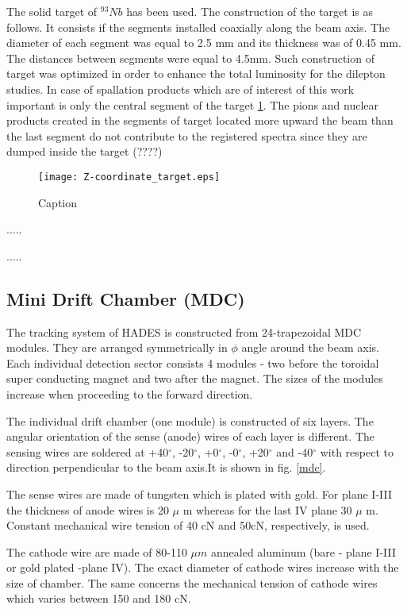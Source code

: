 The solid target of $^{93}Nb$ has been used. 
The construction of the target is as follows. 
It consists if the segments installed coaxially along the beam axis.
The diameter of each segment was equal to 2.5 mm and its thickness was of 0.45 mm.
The distances between segments were equal to 4.5mm. Such construction of target was optimized in order to enhance the total luminosity 
for the dilepton studies. 
In case of spallation products which are of interest of this work important is only the 
central segment of the target \ref{Z-coordinate}. The pions and nuclear products created in the segments of target 
located more upward the beam than the last segment do not contribute to the registered spectra 
since they are dumped inside the target (????)
\begin{figure}[H]
    \centering
    \texttt{[image: Z-coordinate\_target.eps]}
    \caption{Caption}
    \label{Z-coordinate}
\end{figure}
.....

.....


\subsection{Mini Drift Chamber (MDC)}
The tracking system of HADES is constructed from 24-trapezoidal MDC modules. 
They are arranged symmetrically in $\phi$ angle around the beam axis. 
Each individual detection sector consists 4 modules -  two before 
the toroidal super conducting magnet and two after the magnet.
The sizes of the modules increase when proceeding to the forward direction. 

The individual drift chamber (one module) is constructed of six layers. 
The angular orientation of the sense (anode) wires of each layer is different. 
The sensing wires are soldered at +40$^\circ$,  -20$^\circ$, +0$^\circ$, -0$^\circ$, +20$^\circ$ and -40$^\circ$ 
with respect to direction perpendicular to the beam axis.It is shown in fig. \ref{mdc}.   

The sense wires are made of tungsten which is plated with gold. 
For plane I-III the thickness of anode wires is 20 $\mu$ m whereas for the last IV plane 30 $\mu$ m.
Constant mechanical wire tension of 40 cN and 50cN, respectively, is used. 

The cathode wire are made of 80-110 $\mu m$ annealed aluminum 
(bare - plane I-III or gold plated -plane IV). 
The exact diameter of cathode wires increase with the size of chamber.
The same concerns the mechanical tension of cathode wires which varies between 150 and 180 cN.

